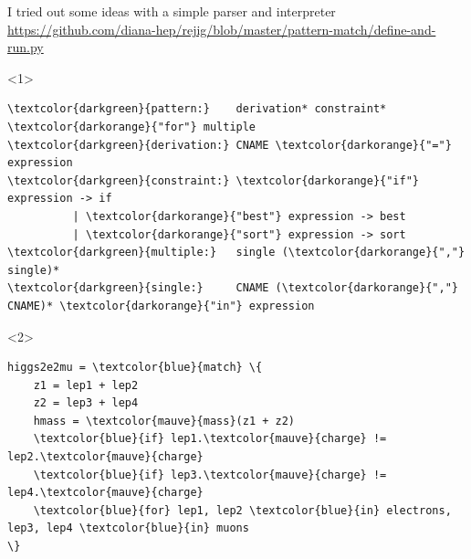 \documentclass[aspectratio=169]{beamer}
\begin{document}
\begin{frame}[fragile]{I tried out some ideas with a simple parser and interpreter}
\Large
\vspace{0.5 cm}
\textcolor{blue}{\small \url{https://github.com/diana-hep/rejig/blob/master/pattern-match/define-and-run.py}}

\vspace{0.5 cm}

\begin{center}
\begin{minipage}{0.85\linewidth}
\normalsize
\begin{onlyenv}<1>
\begin{Verbatim}[commandchars=\\\{\}]
\textcolor{darkgreen}{pattern:}    derivation* constraint* \textcolor{darkorange}{"for"} multiple
\textcolor{darkgreen}{derivation:} CNAME \textcolor{darkorange}{"="} expression
\textcolor{darkgreen}{constraint:} \textcolor{darkorange}{"if"} expression -> if
          | \textcolor{darkorange}{"best"} expression -> best
          | \textcolor{darkorange}{"sort"} expression -> sort
\textcolor{darkgreen}{multiple:}   single (\textcolor{darkorange}{","} single)*
\textcolor{darkgreen}{single:}     CNAME (\textcolor{darkorange}{","} CNAME)* \textcolor{darkorange}{"in"} expression
\end{Verbatim}
\vspace{\baselineskip}
\end{onlyenv}
\begin{onlyenv}<2>
\vspace{-0.5\baselineskip}
\begin{Verbatim}[commandchars=\\\{\}]
higgs2e2mu = \textcolor{blue}{match} \{
    z1 = lep1 + lep2
    z2 = lep3 + lep4
    hmass = \textcolor{mauve}{mass}(z1 + z2)
    \textcolor{blue}{if} lep1.\textcolor{mauve}{charge} != lep2.\textcolor{mauve}{charge}
    \textcolor{blue}{if} lep3.\textcolor{mauve}{charge} != lep4.\textcolor{mauve}{charge}
    \textcolor{blue}{for} lep1, lep2 \textcolor{blue}{in} electrons, lep3, lep4 \textcolor{blue}{in} muons
\}
\end{Verbatim}
\end{onlyenv}
\end{minipage}
\end{center}
\end{frame}
\end{document}
